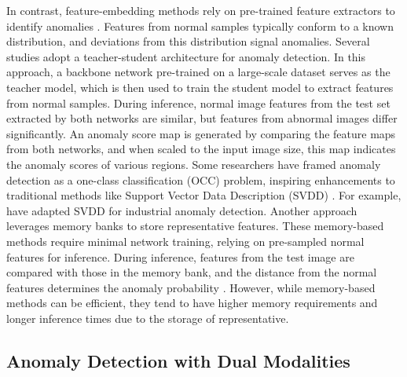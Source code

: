 In contrast, feature-embedding methods rely on pre-trained feature extractors to identify anomalies \cite{rudolph2021same, wang2021student}. Features from normal samples typically conform to a known distribution, and deviations from this distribution signal anomalies. Several studies \cite{bergmann2020uninformed, salehi2021multiresolution, wang2021student, cao2022informative} adopt a teacher-student architecture for anomaly detection. In this approach, a backbone network pre-trained on a large-scale dataset serves as the teacher model, which is then used to train the student model to extract features from normal samples. During inference, normal image features from the test set extracted by both networks are similar, but features from abnormal images differ significantly. An anomaly score map is generated by comparing the feature maps from both networks, and when scaled to the input image size, this map indicates the anomaly scores of various regions. Some researchers have framed anomaly detection as a one-class classification (OCC) problem, inspiring enhancements to traditional methods like Support Vector Data Description (SVDD) \cite{tax2004support, defard2021padim}. For example, \cite{yi2021patch, zhang2021anomaly, hu2021semantic} have adapted SVDD for industrial anomaly detection. Another approach leverages memory banks \cite{li2021anomaly, wan2021industrial, roth2022towards} to store representative features. These memory-based methods require minimal network training, relying on pre-sampled normal features for inference. During inference, features from the test image are compared with those in the memory bank, and the distance from the normal features determines the anomaly probability \cite{lee2022cfa, kim2023fapm, defard2021padim}. However, while memory-based methods can be efficient, they tend to have higher memory requirements and longer inference times due to the storage of representative.

\subsection*{Anomaly Detection with Dual Modalities}

